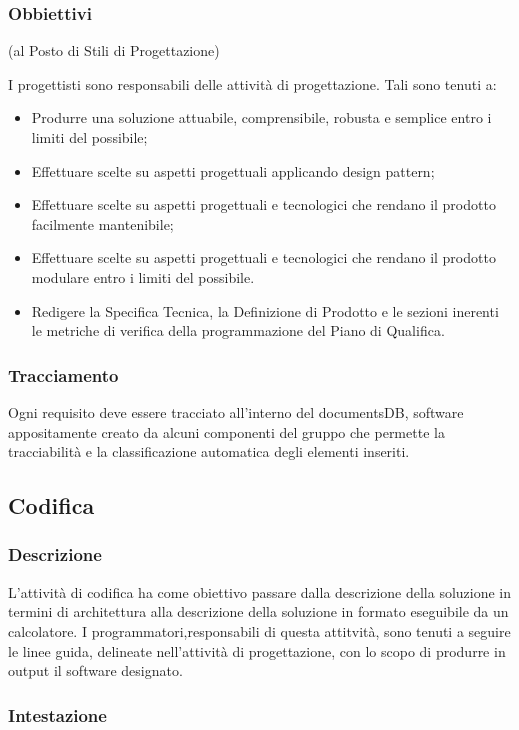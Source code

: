 \subsubsection{Obbiettivi} (al Posto di Stili di Progettazione)

I progettisti sono responsabili delle attività di progettazione. Tali sono tenuti a:
\begin{itemize} 
\item
Produrre una soluzione attuabile, comprensibile, robusta e semplice entro i limiti del possibile;
\item
Effettuare scelte su aspetti progettuali applicando design pattern;
\item
Effettuare scelte su aspetti progettuali e tecnologici che rendano il prodotto facilmente mantenibile;
\item
Effettuare scelte su aspetti progettuali e tecnologici che rendano il prodotto modulare entro i limiti del possibile.
\item
Redigere la Specifica Tecnica, la Definizione di Prodotto e le sezioni inerenti le metriche di verifica della programmazione del Piano di Qualifica.
\end{itemize}
\subsubsection{Tracciamento}
Ogni requisito deve essere tracciato all'interno del documentsDB, software
appositamente creato da alcuni componenti del gruppo che permette la tracciabilità e la classificazione automatica degli elementi inseriti.

\subsection{Codifica}

\subsubsection{Descrizione}
L'attività di codifica ha come obiettivo passare dalla descrizione della soluzione in termini di architettura alla descrizione della soluzione in formato eseguibile da un calcolatore. I programmatori,responsabili di questa attitvità, sono tenuti a seguire le linee guida, delineate nell'attività di progettazione, con lo scopo di produrre in output il software designato. 

\subsubsection{Intestazione}

